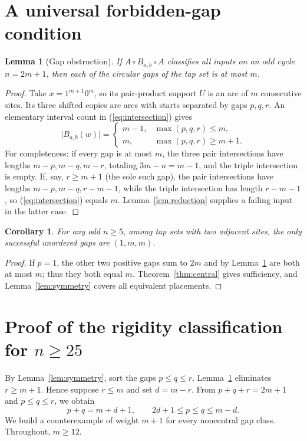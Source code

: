 \documentclass[11pt,a4paper]{article}
\newtheorem{lemma}[theorem]{Lemma}
\newtheorem{corollary}[theorem]{Corollary}
\newcommand{\wt}[1]{\lvert #1\rvert}
\begin{document}
\section{A universal forbidden-gap condition}
\begin{lemma}[Gap obstruction]\label{lem:gap}
If $A\circ B_{a,b}\circ A$ classifies all inputs on an odd cycle $n=2m+1$, then each of the circular gaps of the tap set is at most $m$.
\end{lemma}
\begin{proof}
Take $x=1^{m+1}0^m$, so its pair-product support $U$ is an arc of $m$ consecutive sites. Its three shifted copies are arcs with starts separated by gaps $p,q,r$. An elementary interval count in (\ref{eq:intersection}) gives
\[
\wt{B_{a,b}(w)}=\begin{cases}m-1,&\max(p,q,r)\le m,\\m,&\max(p,q,r)\ge m+1.\end{cases}
\]
For completeness: if every gap is at most $m$, the three pair intersections have lengths $m-p,m-q,m-r$, totaling $3m-n=m-1$, and the triple intersection is empty. If, say, $r\ge m+1$ (the sole such gap), the pair intersections have lengths $m-p,m-q,r-m-1$, while the triple intersection has length $r-m-1$, so (\ref{eq:intersection}) equals $m$. Lemma~\ref{lem:reduction} supplies a failing input in the latter case.
\end{proof}
\begin{corollary}\label{cor:adjacent}
For any odd $n\ge5$, among tap sets with two adjacent sites, the only successful unordered gaps are $(1,m,m)$.
\end{corollary}
\begin{proof}
If $p=1$, the other two positive gaps sum to $2m$ and by Lemma~\ref{lem:gap} are both at most $m$; thus they both equal $m$. Theorem~\ref{thm:central} gives sufficiency, and Lemma~\ref{lem:symmetry} covers all equivalent placements.
\end{proof}

\section{Proof of the rigidity classification for $n\ge25$}
By Lemma~\ref{lem:symmetry}, sort the gaps $p\le q\le r$. Lemma~\ref{lem:gap} eliminates $r\ge m+1$. Hence suppose $r\le m$ and set $d=m-r$. From $p+q+r=2m+1$ and $p\le q\le r$, we obtain
\begin{equation}\label{eq:range}
 p+q=m+d+1,\qquad 2d+1\le p\le q\le m-d.
\end{equation}
We build a counterexample of weight $m+1$ for every noncentral gap class. Throughout, $m\ge12$.
\end{document}
